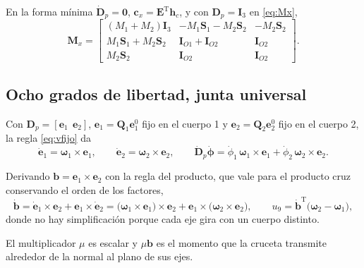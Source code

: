 \documentclass[11pt]{article}
\newcommand{\T}{^{\mathrm{T}}}
\newcommand{\wv}{\boldsymbol{\omega}}
\newcommand{\IO}[1]{\mathbf{I}_{O#1}}
\begin{document}
En la forma mínima $\dot{\mathbf{D}}_p=\mathbf{0}$, $\mathbf{c}_x=\mathbf{E}\T\mathbf{h}_c$, y con $\mathbf{D}_p=\mathbf{I}_3$ en \eqref{eq:Mx},
\begin{equation}
\mathbf{M}_x=
\begin{bmatrix}
(M_1+M_2)\mathbf{I}_3 & -M_1\mathbf{S}_1-M_2\mathbf{S}_2 & -M_2\mathbf{S}_2\\
M_1\mathbf{S}_1+M_2\mathbf{S}_2 & \IO{1}+\IO{2} & \IO{2}\\
M_2\mathbf{S}_2 & \IO{2} & \IO{2}
\end{bmatrix}.
\label{eq:Mx9}
\end{equation}

\subsection{Ocho grados de libertad, junta universal}

Con $\mathbf{D}_p=[\mathbf{e}_1\ \ \mathbf{e}_2]$, $\mathbf{e}_1=\mathbf{Q}_1\mathbf{e}_1^0$ fijo en el cuerpo 1 y $\mathbf{e}_2=\mathbf{Q}_2\mathbf{e}_2^0$ fijo en el cuerpo 2, la regla \eqref{eq:vfijo} da
\begin{equation}
\dot{\mathbf{e}}_1=\wv_1\times\mathbf{e}_1,
\qquad
\dot{\mathbf{e}}_2=\wv_2\times\mathbf{e}_2,
\qquad
\dot{\mathbf{D}}_p\dot{\boldsymbol{\phi}}=\dot\phi_1\,\wv_1\times\mathbf{e}_1+\dot\phi_2\,\wv_2\times\mathbf{e}_2 .
\label{eq:Ddotu}
\end{equation}

Derivando $\mathbf{b}=\mathbf{e}_1\times\mathbf{e}_2$ con la regla del producto, que vale para el producto cruz conservando el orden de los factores,
\begin{equation}
\dot{\mathbf{b}}=\dot{\mathbf{e}}_1\times\mathbf{e}_2+\mathbf{e}_1\times\dot{\mathbf{e}}_2
=\big(\wv_1\times\mathbf{e}_1\big)\times\mathbf{e}_2+\mathbf{e}_1\times\big(\wv_2\times\mathbf{e}_2\big),
\qquad
u_9=\dot{\mathbf{b}}\T\big(\wv_2-\wv_1\big),
\label{eq:u9}
\end{equation}
donde no hay simplificación porque cada eje gira con un cuerpo distinto.

El multiplicador $\mu$ es escalar y $\mu\mathbf{b}$ es el momento que la cruceta transmite alrededor de la normal al plano de sus ejes.
\end{document}
